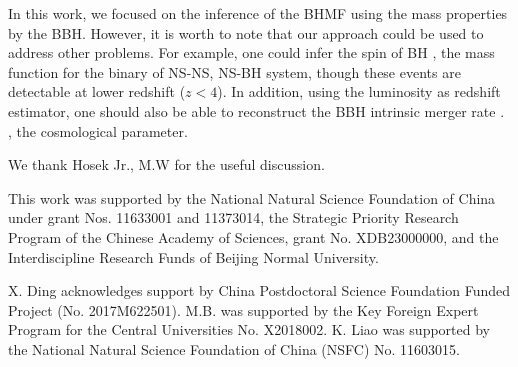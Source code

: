 \documentclass[twocolumn]{aastex62}
\begin{document}
In this work, we focused on the inference of the BHMF using the mass properties by the BBH. However, it is worth to note that our approach could be used to address other problems. For example, one could infer the spin of BH \citep{Abbott2018b}, the mass function for the binary of NS-NS, NS-BH system, though these events are detectable at lower redshift ($z<4$). In addition, using the luminosity as redshift estimator, one should also be able to reconstruct the BBH intrinsic merger rate \citep{Fishbach2018}. 
, the cosmological parameter.


\acknowledgments
We thank Hosek Jr., M.W for the useful discussion.

This work was supported by the National Natural Science Foundation of China under grant Nos. 11633001 and 11373014, the Strategic Priority Research Program of the Chinese Academy of Sciences, grant No. XDB23000000, and the Interdiscipline Research Funds of Beijing Normal University.

X. Ding acknowledges support by China Postdoctoral Science Foundation Funded Project (No. 2017M622501).
M.B. was supported by the Key Foreign Expert Program for the Central Universities No. X2018002.
K. Liao was supported by the National Natural Science Foundation of China (NSFC) No. 11603015.


%


\end{document}
